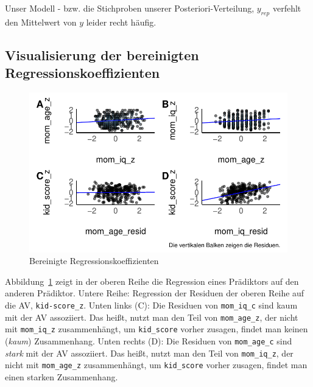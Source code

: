 \documentclass[
  a4paper,
  DIV=11]{scrreprt}
\theoremstyle{definition}
\theoremstyle{remark}
\begin{document}
Unser Modell - bzw. die Stichproben unserer Posteriori-Verteilung,
\(y_{rep}\) verfehlt den Mittelwert von \(y\) leider recht häufig.

\hypertarget{visualisierung-der-bereinigten-regressionskoeffizienten}{%
\subsection{Visualisierung der bereinigten
Regressionskoeffizienten}\label{visualisierung-der-bereinigten-regressionskoeffizienten}}

\begin{figure}

{\centering \includegraphics{./metrische-AV_files/figure-pdf/fig-bereinigt-1.pdf}

}

\caption{\label{fig-bereinigt}Bereinigte Regressionskoeffizienten}

\end{figure}

Abbildung~\ref{fig-bereinigt} zeigt in der oberen Reihe die Regression
eines Prädiktors auf den anderen Prädiktor. Untere Reihe: Regression der
Residuen der oberen Reihe auf die AV, \texttt{kid-score\_z}. Unten links
(C): Die Residuen von \texttt{mom\_iq\_c} sind kaum mit der AV
assoziiert. Das heißt, nutzt man den Teil von \texttt{mom\_age\_z}, der
nicht mit \texttt{mom\_iq\_z} zusammenhängt, um \texttt{kid\_score}
vorher zusagen, findet man keinen (\emph{kaum}) Zusammenhang. Unten
rechts (D): Die Residuen von \texttt{mom\_age\_c} sind \emph{stark} mit
der AV assoziiert. Das heißt, nutzt man den Teil von
\texttt{mom\_iq\_z}, der nicht mit \texttt{mom\_age\_z} zusammenhängt,
um \texttt{kid\_score} vorher zusagen, findet man einen starken
Zusammenhang.
\end{document}
